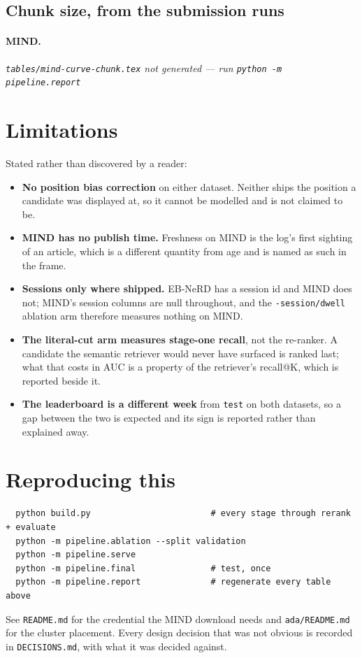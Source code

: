 \documentclass[11pt,a4paper]{article}
\newcommand{\inputtable}[1]{%
  \IfFileExists{tables/#1.tex}{}%
  {\emph{\texttt{tables/#1.tex} not generated --- run \texttt{python -m pipeline.report}}}%
}
\begin{document}
\subsection{Chunk size, from the submission runs}

\paragraph{MIND.}
\inputtable{mind-curve-chunk}

\section{Limitations}

Stated rather than discovered by a reader:

\begin{itemize}
  \item \textbf{No position bias correction} on either dataset. Neither ships
    the position a candidate was displayed at, so it cannot be modelled and is
    not claimed to be.
  \item \textbf{MIND has no publish time.} Freshness on MIND is the log's
    first sighting of an article, which is a different quantity from age and
    is named as such in the frame.
  \item \textbf{Sessions only where shipped.} EB-NeRD has a session id and
    MIND does not; MIND's session columns are null throughout, and the
    \texttt{-session/dwell} ablation arm therefore measures nothing on MIND.
  \item \textbf{The literal-cut arm measures stage-one recall}, not the
    re-ranker. A candidate the semantic retriever would never have surfaced is
    ranked last; what that costs in AUC is a property of the retriever's
    recall@K, which is reported beside it.
  \item \textbf{The leaderboard is a different week} from \texttt{test} on both
    datasets, so a gap between the two is expected and its sign is reported
    rather than explained away.
\end{itemize}

\section{Reproducing this}

\begin{verbatim}
  python build.py                        # every stage through rerank + evaluate
  python -m pipeline.ablation --split validation
  python -m pipeline.serve
  python -m pipeline.final               # test, once
  python -m pipeline.report              # regenerate every table above
\end{verbatim}

\noindent
See \texttt{README.md} for the credential the MIND download needs and
\texttt{ada/README.md} for the cluster placement. Every design decision that
was not obvious is recorded in \texttt{DECISIONS.md}, with what it was decided
against.
\end{document}

